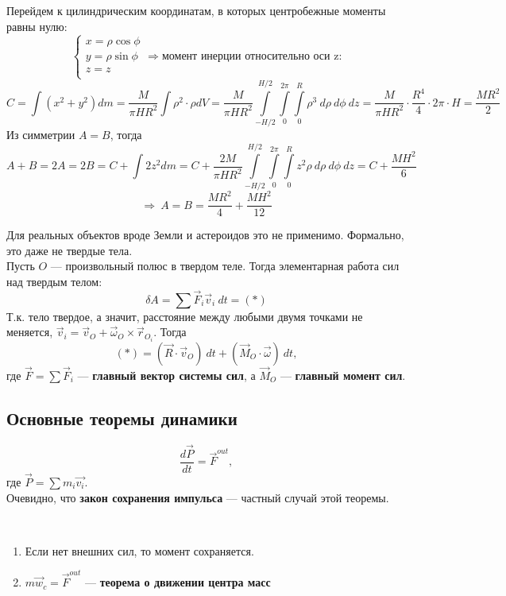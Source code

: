 \begin{example}
    Перейдем к цилиндрическим координатам, в которых центробежные моменты равны нулю:
    \[
    \begin{cases}
        x = \rho \cos{\phi}\\
        y = \rho \sin{\phi}\\
        z = z\\
    \end{cases} \Longrightarrow \text{момент инерции относительно оси z:}
    \]
    \[
    C = \int (x^2 + y^2)d m = \dfrac{M}{\pi H R^2} \int \rho^2 \cdot \rho dV = \dfrac{M}{\pi H R^2} \int \limits_{-H/2}^{H/2}\int \limits_0^{2\pi} \int \limits_0^R \rho^3 ~d \rho ~d \phi ~d z = \dfrac{M}{\pi H R^2} \cdot \dfrac{R^4}{4} \cdot 2\pi \cdot H = \dfrac{MR^2}{2}
    \]
    Из симметрии $A = B$, тогда
    \[
    A + B = 2A = 2B = C + \int 2z^2 dm = C + \dfrac{2M}{\pi H R^2} \int \limits_{-H/2}^{H/2}\int \limits_0^{2\pi} \int \limits_0^Rz^2 \rho~d\rho~d\phi~d z = C + \dfrac{MH^2}{6} 
    \]
    \[
    \Longrightarrow \ A = B = \dfrac{MR^2}{4} + \dfrac{MH^2}{12}
    \]
\end{example}

Для реальных объектов вроде Земли и астероидов это не применимо. Формально, это даже не твердые тела.\\

Пусть $O$ --- произвольный полюс в твердом теле. Тогда элементарная работа сил над твердым телом:
\[
\delta A = \sum \vec{F}_i \vec{v}_i~ dt = (*)
\]
Т.к. тело твердое, а значит, расстояние между любыми двумя точками не меняется, $\vec{v}_i = \vec{v}_O + \vec{\omega}_O \times \vec{r}_{O_i}$. Тогда
\[
(*) = (\vec{R} \cdot \vec{v}_O)~d t + (\vec{M}_O \cdot \vec{\omega})~d t,
\]
где $\vec{F} = \sum \vec{F}_i$ --- \textbf{главный вектор системы сил}, а $\vec{M}_O$ --- \textbf{главный момент сил}.

\subsection{Основные теоремы динамики}
\begin{theorem}
\[
\dfrac{d \vec{P}}{d t} = \vec{F}^{out},
\]
где $\vec{P} = \sum m_i \vec{v_i}$.\\
Очевидно, что \textbf{закон сохранения импульса} --- частный случай этой теоремы.
\end{theorem}
\begin{note} $~$
    \begin{enumerate}
        \item Если нет внешних сил, то момент сохраняется.
        \item $m \vec{w}_c = \vec{F}^{out}$ --- \textbf{теорема о движении центра масс}
    \end{enumerate}
\end{note}


